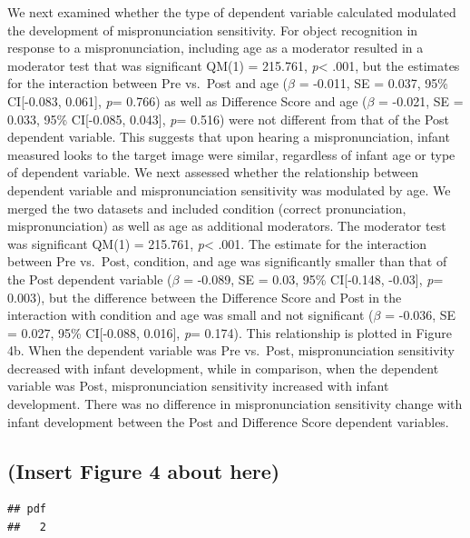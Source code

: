 \documentclass[man]{apa6}
\theoremstyle{definition}
\theoremstyle{definition}
\theoremstyle{definition}
\theoremstyle{remark}
\begin{document}
We next examined whether the type of dependent variable calculated
modulated the development of mispronunciation sensitivity. For object
recognition in response to a mispronunciation, including age as a
moderator resulted in a moderator test that was significant QM(1) =
215.761, \emph{p}\textless{} .001, but the estimates for the interaction
between Pre vs.~Post and age (\(\beta\) = -0.011, SE = 0.037, 95\%
CI{[}-0.083, 0.061{]}, \emph{p}= 0.766) as well as Difference Score and
age (\(\beta\) = -0.021, SE = 0.033, 95\% CI{[}-0.085, 0.043{]},
\emph{p}= 0.516) were not different from that of the Post dependent
variable. This suggests that upon hearing a mispronunciation, infant
measured looks to the target image were similar, regardless of infant
age or type of dependent variable. We next assessed whether the
relationship between dependent variable and mispronunciation sensitivity
was modulated by age. We merged the two datasets and included condition
(correct pronunciation, mispronunciation) as well as age as additional
moderators. The moderator test was significant QM(1) = 215.761,
\emph{p}\textless{} .001. The estimate for the interaction between Pre
vs.~Post, condition, and age was significantly smaller than that of the
Post dependent variable (\(\beta\) = -0.089, SE = 0.03, 95\%
CI{[}-0.148, -0.03{]}, \emph{p}= 0.003), but the difference between the
Difference Score and Post in the interaction with condition and age was
small and not significant (\(\beta\) = -0.036, SE = 0.027, 95\%
CI{[}-0.088, 0.016{]}, \emph{p}= 0.174). This relationship is plotted in
Figure 4b. When the dependent variable was Pre vs.~Post,
mispronunciation sensitivity decreased with infant development, while in
comparison, when the dependent variable was Post, mispronunciation
sensitivity increased with infant development. There was no difference
in mispronunciation sensitivity change with infant development between
the Post and Difference Score dependent variables.

\subsection{(Insert Figure 4 about
here)}\label{insert-figure-4-about-here}

\begin{verbatim}
## pdf 
##   2
\end{verbatim}
\end{document}
